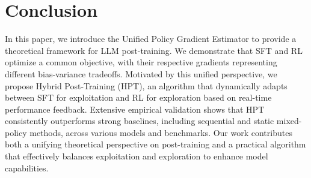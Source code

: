 \section{Conclusion}

In this paper, we introduce the Unified Policy Gradient Estimator to provide a theoretical framework for LLM post-training. We demonstrate that SFT and RL optimize a common objective, with their respective gradients representing different bias-variance tradeoffs. Motivated by this unified perspective, we propose Hybrid Post-Training (HPT), an algorithm that dynamically adapts between SFT for exploitation and RL for exploration based on real-time performance feedback. Extensive empirical validation shows that HPT consistently outperforms strong baselines, including sequential and static mixed-policy methods, across various models and benchmarks. Our work contributes both a unifying theoretical perspective on post-training and a practical algorithm that effectively balances exploitation and exploration to enhance model capabilities.
